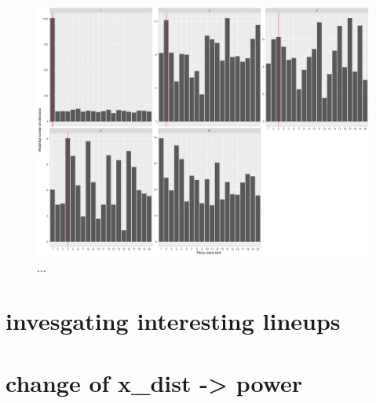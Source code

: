 \documentclass[]{interact}
\theoremstyle{plain}%
\theoremstyle{definition}
\theoremstyle{remark}
\begin{document}
\begin{figure}

{\centering \includegraphics[width=1\linewidth]{paper_comparison_files/figure-latex/dadtaplotselfacet-1} 

}

\caption{...}\label{fig:dadtaplotselfacet}
\end{figure}

\hypertarget{invesgating-interesting-lineups}{%
\section{invesgating interesting
lineups}\label{invesgating-interesting-lineups}}

\hypertarget{change-of-x_dist---power}{%
\section{change of x\_dist -\textgreater{}
power}\label{change-of-x_dist---power}}



\end{document}
